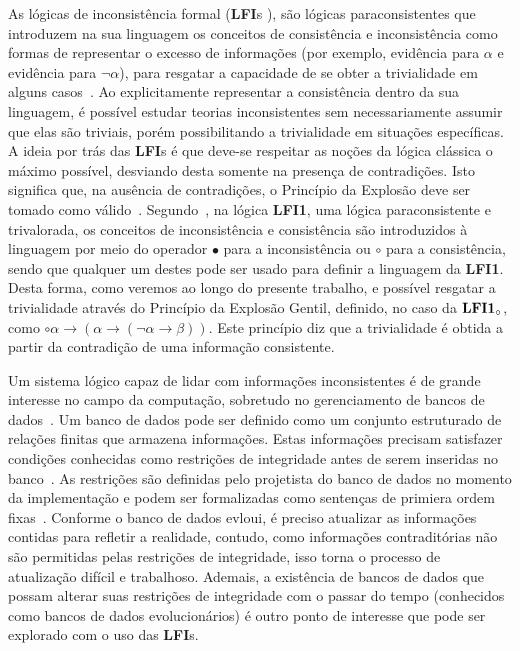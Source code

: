 As lógicas de inconsistência formal (\textbf{LFI}s ), são lógicas paraconsistentes que introduzem na sua linguagem os conceitos de consistência e inconsistência como formas de representar o excesso de informações (por exemplo, evidência para $\alpha$ e evidência para $\neg \alpha$), para resgatar a capacidade de se obter a trivialidade em alguns casos~\cite{carnielli2007}. Ao explicitamente representar a consistência dentro da sua linguagem, é possível estudar teorias inconsistentes sem necessariamente assumir que elas são triviais, porém possibilitando a trivialidade em situações específicas. A ideia por trás das \textbf{LFI}s é que deve-se respeitar as noções da lógica clássica o máximo possível, desviando desta somente na presença de contradições. Isto significa que, na ausência de contradições, o Princípio da Explosão deve ser tomado como válido~\cite{sep-logic-paraconsistent}. Segundo~, na lógica \textbf{LFI1}, uma lógica paraconsistente e trivalorada, os conceitos de inconsistência e consistência são introduzidos à linguagem por meio do operador $\bullet$ para a inconsistência ou $\circ$ para a consistência, sendo que qualquer um destes pode ser usado para definir a linguagem da \textbf{LFI1}. Desta forma, como veremos ao longo do presente trabalho, e possível resgatar a trivialidade através do Princípio da Explosão Gentil, definido, no caso da $\text{\textbf{LFI1}}_{\circ}$, como $\circ \alpha \rightarrow (\alpha \rightarrow (\neg \alpha \rightarrow \beta))$\cite{carnielli2007}. Este princípio diz que a trivialidade é obtida a partir da contradição de uma informação consistente.


Um sistema lógico capaz de lidar com informações inconsistentes é de grande interesse no campo da computação, sobretudo no gerenciamento de bancos de dados~\cite{carnielli2000formal}. Um banco de dados pode ser definido como um conjunto estruturado de relações finitas que armazena informações. Estas informações precisam satisfazer condições conhecidas como restrições de integridade antes de serem inseridas no banco~\cite{Codd}. As restrições são definidas pelo projetista do banco de dados no momento da implementação e podem ser formalizadas como sentenças de primiera ordem fixas~\cite{carnielli2000formal}. Conforme o banco de dados evloui, é preciso atualizar as informações contidas para refletir a realidade, contudo, como informações contraditórias não são permitidas pelas restrições de integridade, isso torna o processo de atualização difícil e trabalhoso. Ademais, a existência de bancos de dados que possam alterar suas restrições de integridade com o passar do tempo (conhecidos como bancos de dados evolucionários) é outro ponto de interesse que pode ser explorado com o uso das \textbf{LFI}s.

